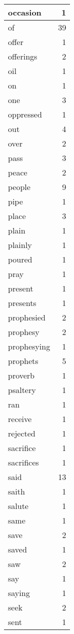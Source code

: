 \begin{center}
\begin{longtable}{l|r}
occasion & 1 \\ \hline
of & 39 \\ \hline
offer & 1 \\ \hline
offerings & 2 \\ \hline
oil & 1 \\ \hline
on & 1 \\ \hline
one & 3 \\ \hline
oppressed & 1 \\ \hline
out & 4 \\ \hline
over & 2 \\ \hline
pass & 3 \\ \hline
peace & 2 \\ \hline
people & 9 \\ \hline
pipe & 1 \\ \hline
place & 3 \\ \hline
plain & 1 \\ \hline
plainly & 1 \\ \hline
poured & 1 \\ \hline
pray & 1 \\ \hline
present & 1 \\ \hline
presents & 1 \\ \hline
prophesied & 2 \\ \hline
prophesy & 2 \\ \hline
prophesying & 1 \\ \hline
prophets & 5 \\ \hline
proverb & 1 \\ \hline
psaltery & 1 \\ \hline
ran & 1 \\ \hline
receive & 1 \\ \hline
rejected & 1 \\ \hline
sacrifice & 1 \\ \hline
sacrifices & 1 \\ \hline
said & 13 \\ \hline
saith & 1 \\ \hline
salute & 1 \\ \hline
same & 1 \\ \hline
save & 2 \\ \hline
saved & 1 \\ \hline
saw & 2 \\ \hline
say & 1 \\ \hline
saying & 1 \\ \hline
seek & 2 \\ \hline
sent & 1 \\ \hline

\end{longtable}
\end{center}
